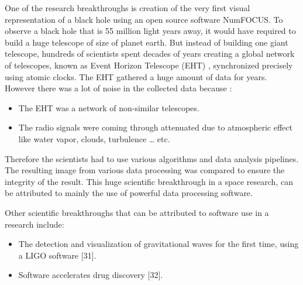 One of the research breakthroughs is creation of the very first visual representation of a black hole using an open source software NumFOCUS. To observe a black hole that is 55 million light years away, it would have required to build a huge telescope of size of planet earth. But instead of building one giant telescope, hundreds of scientists spent decades of years creating a global network of telescopes, known as Event Horizon Telescope (EHT) \cite{enwiki:1052167868}, synchronized precisely using atomic clocks. The EHT gathered a huge amount of data for years. However there was a lot of noise in the collected data because :
	\vspace{-1mm}   %
	\begin{itemize}[noitemsep,topsep=5pt, leftmargin=0.5in] %
		\item The EHT was a network of non-similar telescopes.
		\item The radio signals were coming through attenuated due to atmospheric effect like water vapor, clouds, turbulence … etc.
	\end{itemize}
Therefore the scientists had to use various algorithms and data analysis pipelines. The resulting image from various data processing was compared to ensure the integrity of the result. This huge scientific breakthrough in a space research, can be attributed to mainly the use of powerful data processing software. 

Other scientific breakthroughs that can be attributed to software use in a research include:

	\vspace{-1mm}   %
	\begin{itemize}[noitemsep,topsep=5pt, leftmargin=0.5in] %
		\item The detection and visualization of gravitational waves for the first time, using a LIGO software \cite{enwiki:1047100294}[31]. 
		\item Software accelerates drug discovery [32].
	\end{itemize}


\clearpage